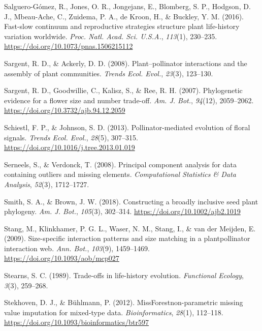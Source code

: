 \documentclass[
  12pt,
  a4paper,
]{article}
\newlength{\cslhangindent}
\newlength{\cslentryspacingunit} %
\newenvironment{CSLReferences}[2] %
 {%
  \setlength{\parindent}{0pt}
  \ifodd #1
  \let\oldpar\par
  \def\par{\hangindent=\cslhangindent\oldpar}
  \fi
  \setlength{\parskip}{#2\cslentryspacingunit}
 }%
 {}
\begin{document}
\begin{CSLReferences}{1}{0}
\leavevmode{}%
Salguero-Gómez, R., Jones, O. R., Jongejans, E., Blomberg, S. P., Hodgson, D. J., Mbeau-Ache, C., Zuidema, P. A., de Kroon, H., \& Buckley, Y. M. (2016). Fast-slow continuum and reproductive strategies structure plant life-history variation worldwide. \emph{Proc. Natl. Acad. Sci. U.S.A.}, \emph{113}(1), 230--235. \url{https://doi.org/10.1073/pnas.1506215112}

\leavevmode{}%
Sargent, R. D., \& Ackerly, D. D. (2008). Plant--pollinator interactions and the assembly of plant communities. \emph{Trends Ecol. Evol.}, \emph{23}(3), 123--130.

\leavevmode{}%
Sargent, R. D., Goodwillie, C., Kalisz, S., \& Ree, R. H. (2007). Phylogenetic evidence for a flower size and number trade-off. \emph{Am. J. Bot.}, \emph{94}(12), 2059--2062. \url{https://doi.org/10.3732/ajb.94.12.2059}

\leavevmode{}%
Schiestl, F. P., \& Johnson, S. D. (2013). Pollinator-mediated evolution of floral signals. \emph{Trends Ecol. Evol.}, \emph{28}(5), 307--315. \url{https://doi.org/10.1016/j.tree.2013.01.019}

\leavevmode{}%
Serneels, S., \& Verdonck, T. (2008). Principal component analysis for data containing outliers and missing elements. \emph{Computational Statistics \& Data Analysis}, \emph{52}(3), 1712--1727.

\leavevmode{}%
Smith, S. A., \& Brown, J. W. (2018). Constructing a broadly inclusive seed plant phylogeny. \emph{Am. J. Bot.}, \emph{105}(3), 302--314. \url{https://doi.org/10.1002/ajb2.1019}

\leavevmode{}%
Stang, M., Klinkhamer, P. G. L., Waser, N. M., Stang, I., \& van der Meijden, E. (2009). Size-specific interaction patterns and size matching in a plant\textendash pollinator interaction web. \emph{Ann. Bot.}, \emph{103}(9), 1459--1469. \url{https://doi.org/10.1093/aob/mcp027}

\leavevmode{}%
Stearns, S. C. (1989). Trade-offs in life-history evolution. \emph{Functional Ecology}, \emph{3}(3), 259--268.

\leavevmode{}%
Stekhoven, D. J., \& Bühlmann, P. (2012). {MissForest}\textemdash non-parametric missing value imputation for mixed-type data. \emph{Bioinformatics}, \emph{28}(1), 112--118. \url{https://doi.org/10.1093/bioinformatics/btr597}


\end{CSLReferences}
\end{document}
